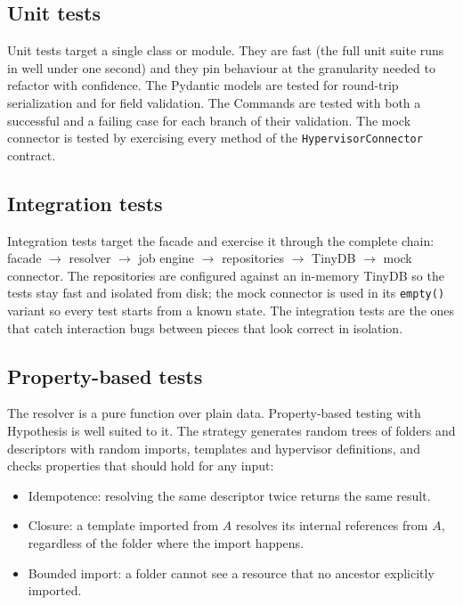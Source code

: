 \subsection{Unit tests}

Unit tests target a single class or module. They are fast (the full
unit suite runs in well under one second) and they pin behaviour at
the granularity needed to refactor with confidence. The Pydantic
models are tested for round-trip serialization and for field
validation. The Commands are tested with both a successful and a
failing case for each branch of their validation. The mock
connector is tested by exercising every method of the
\texttt{HypervisorConnector} contract.

\subsection{Integration tests}

Integration tests target the facade and exercise it through the
complete chain: facade $\to$ resolver $\to$ job engine $\to$
repositories $\to$ TinyDB $\to$ mock connector. The repositories
are configured against an in-memory TinyDB so the tests stay fast
and isolated from disk; the mock connector is used in its
\texttt{empty()} variant so every test starts from a known state.
The integration tests are the ones that catch interaction bugs
between pieces that look correct in isolation.

\subsection{Property-based tests}

The resolver is a pure function over plain data. Property-based
testing with Hypothesis is well suited to it.
The strategy generates random trees of folders and descriptors with
random imports, templates and hypervisor definitions, and checks
properties that should hold for any input:

\begin{itemize}
  \item Idempotence: resolving the same descriptor twice returns
        the same result.
  \item Closure: a template imported from $A$ resolves its internal
        references from $A$, regardless of the folder where the
        import happens.
  \item Bounded import: a folder cannot see a resource that no
        ancestor explicitly imported.
\end{itemize}

